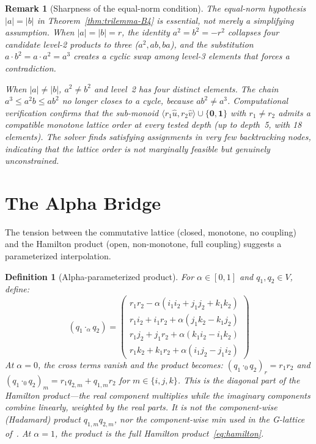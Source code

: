 \documentclass[11pt,a4paper]{article}
\newtheorem{definition}[theorem]{Definition}
\newtheorem{remark}[theorem]{Remark}
\begin{document}
\begin{remark}[Sharpness of the equal-norm condition]
\label{rem:sharpness}
The equal-norm hypothesis $|a| = |b|$ in
Theorem~\ref{thm:trilemma-B4} is essential, not merely a simplifying
assumption. When $|a| = |b| = r$, the identity $a^2 = b^2 = -r^2$
collapses four candidate level-2 products to three ($a^2, ab, ba$),
and the substitution $a \cdot b^2 = a \cdot a^2 = a^3$ creates a
cyclic swap among level-3 elements that forces a contradiction.

When $|a| \neq |b|$, $a^2 \neq b^2$ and level~2 has four distinct
elements. The chain $a^3 \leq a^2 b \leq a b^2$ no longer closes to
a cycle, because $a b^2 \neq a^3$. Computational verification
confirms that the sub-monoid
$\langle r_1 \hat{u}, r_2 \hat{v}\rangle \cup \{\mathbf{0},
\mathbf{1}\}$ with $r_1 \neq r_2$ admits a compatible monotone
lattice order at every tested depth (up to depth~5, with 18
elements). The solver finds satisfying assignments in very few
backtracking nodes, indicating that the lattice order is not
marginally feasible but genuinely unconstrained.
\end{remark}

\section{The Alpha Bridge}
\label{sec:alpha}

The tension between the commutative lattice (closed, monotone, no
coupling) and the Hamilton product (open, non-monotone, full coupling)
suggests a parameterized interpolation.

\begin{definition}[Alpha-parameterized product]
\label{def:alpha}
For $\alpha \in [0,1]$ and $q_1, q_2 \in V$, define:
\begin{equation}
\label{eq:alpha}
(q_1 \cdot_\alpha q_2) = \begin{pmatrix}
  r_1 r_2 - \alpha(i_1 i_2 + j_1 j_2 + k_1 k_2) \\
  r_1 i_2 + i_1 r_2 + \alpha(j_1 k_2 - k_1 j_2) \\
  r_1 j_2 + j_1 r_2 + \alpha(k_1 i_2 - i_1 k_2) \\
  r_1 k_2 + k_1 r_2 + \alpha(i_1 j_2 - j_1 i_2)
\end{pmatrix}
\end{equation}
At $\alpha = 0$, the cross terms vanish and the product becomes:
$(q_1 \cdot_0 q_2)_r = r_1 r_2$ and
$(q_1 \cdot_0 q_2)_m = r_1 q_{2,m} + q_{1,m} r_2$ for
$m \in \{i, j, k\}$. This is the \emph{diagonal part} of the Hamilton
product---the real component multiplies while the imaginary components
combine linearly, weighted by the real parts. It is \emph{not} the
component-wise (Hadamard) product $q_{1,m} q_{2,m}$, nor the
component-wise min used in the G-lattice of~\citet{p11}.
At $\alpha = 1$, the product is the full Hamilton
product~\eqref{eq:hamilton}.
\end{definition}
\end{document}
